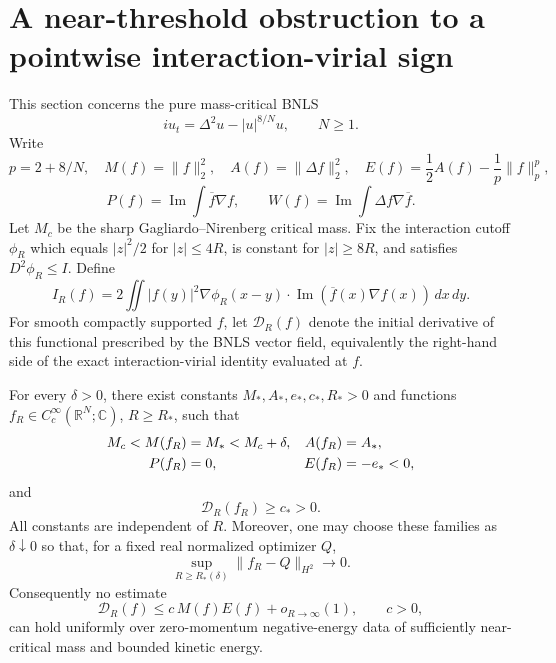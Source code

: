 \section{A near-threshold obstruction to a pointwise interaction-virial sign}
\label{sec:r9-virial-obstruction}

This section concerns the pure mass-critical BNLS
\[
 iu_t=\Delta^2u-|u|^{8/N}u,\qquad N\ge1.
\]
Write
\[
 p=2+8/N,\quad M(f)=\|f\|_2^2,\quad A(f)=\|\Delta f\|_2^2,
 \quad E(f)=\frac12A(f)-\frac1p\|f\|_p^p,
\]
\[
 P(f)=\operatorname{Im}\int\overline f\nabla f,
 \qquad W(f)=\operatorname{Im}\int\Delta f\nabla\overline f.
\]
Let $M_c$ be the sharp Gagliardo--Nirenberg critical mass. Fix the
interaction cutoff $\phi_R$ which equals $|z|^2/2$ for $|z|\le4R$,
is constant for $|z|\ge8R$, and satisfies $D^2\phi_R\le I$. Define
\begin{equation}\label{eq:r9-interaction-functional}
 I_R(f)=2\iint |f(y)|^2\nabla\phi_R(x-y)\cdot
       \operatorname{Im}(\overline f(x)\nabla f(x))\,dx\,dy.
\end{equation}
For smooth compactly supported $f$, let $\mathcal D_R(f)$ denote
the initial derivative of this functional prescribed by the BNLS
vector field, equivalently the right-hand side of the exact
interaction-virial identity evaluated at $f$.

\begin{theorem}
\label{thm:r9-static-obstruction}
For every $\delta>0$, there exist constants
$M_*,A_*,e_*,c_*,R_*>0$ and functions
$f_R\in C_c^\infty(\mathbb R^N;\mathbb C)$, $R\ge R_*$, such that
\begin{align}
 M_c<M(f_R)&=M_*<M_c+\delta,&
 A(f_R)&=A_*,\label{eq:r9-static-invariants}\\
 P(f_R)&=0,&E(f_R)&=-e_*<0,\notag
\end{align}
and
\begin{equation}\label{eq:r9-static-positive}
 \mathcal D_R(f_R)\ge c_*>0.
\end{equation}
All constants are independent of $R$. Moreover, one may choose
these families as $\delta\downarrow0$ so that, for a fixed real
normalized optimizer $Q$,
\[
 \sup_{R\ge R_*(\delta)}\|f_R-Q\|_{H^2}\longrightarrow0.
\]
Consequently no estimate
\[
 \mathcal D_R(f)\le c\,M(f)E(f)+o_{R\to\infty}(1),\qquad c>0,
\]
can hold uniformly over zero-momentum negative-energy data of
sufficiently near-critical mass and bounded kinetic energy.
\end{theorem}

